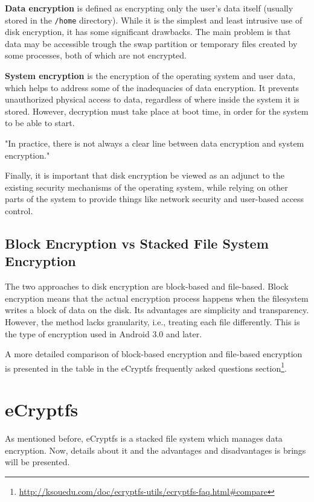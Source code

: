 \textbf{Data encryption} is defined as encrypting only the user's data itself (usually stored in the \texttt{/home} directory). While it is the simplest and least intrusive use of disk encryption, it has some significant drawbacks. The main problem is that data may be accessible trough the swap partition or temporary files created by some processes, both of which are not encrypted.

\textbf{System encryption} is the encryption of the operating system and user data, which helps to address some of the inadequacies of data encryption. It prevents unauthorized physical access to data, regardless of where inside the system it is stored. However, decryption must take place at boot time, in order for the system to be able to start.

"In practice, there is not always a clear line between data encryption and system encryption\cite{disk-enc}."

Finally, it is important that disk encryption be viewed as an adjunct to the existing security mechanisms of the operating system, while relying on other parts of the system to provide things like network security and user-based access control.

\subsection{Block Encryption vs Stacked File System Encryption}
\label{sub-sec:be-vs-sfse}

The two approaches to disk encryption are block-based and file-based. Block encryption means that the actual encryption process happens when the filesystem writes a block of data on the disk. Its advantages are simplicity and transparency. However, the method lacks granularity, i.e., treating each file differently. This is the type of encryption used in Android 3.0 and later.

A more detailed comparison of block-based encryption and file-based encryption is presented in the table in the eCryptfs frequently asked questions section\footnote{\url{http://ksouedu.com/doc/ecryptfs-utils/ecryptfs-faq.html\#compare}}.

\section{eCryptfs}
\label{sec:de-ecryptfs}

As mentioned before, eCryptfs is a stacked file system which manages data encryption. Now, details about it and the advantages and disadvantages is brings will be presented.

